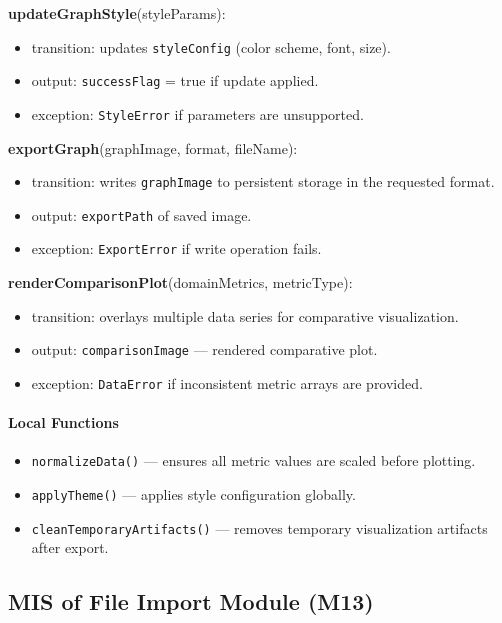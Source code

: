 \documentclass[12pt, titlepage]{article}
\begin{document}
\noindent \textbf{updateGraphStyle}(styleParams):
\begin{itemize}
  \item transition: updates \texttt{styleConfig} (color scheme, font, size).
  \item output: \texttt{successFlag} = true if update applied.
  \item exception: \texttt{StyleError} if parameters are unsupported.
\end{itemize}

\noindent \textbf{exportGraph}(graphImage, format, fileName):
\begin{itemize}
  \item transition: writes \texttt{graphImage} to persistent storage in the requested format.
  \item output: \texttt{exportPath} of saved image.
  \item exception: \texttt{ExportError} if write operation fails.
\end{itemize}

\noindent \textbf{renderComparisonPlot}(domainMetrics, metricType):
\begin{itemize}
  \item transition: overlays multiple data series for comparative visualization.
  \item output: \texttt{comparisonImage} — rendered comparative plot.
  \item exception: \texttt{DataError} if inconsistent metric arrays are provided.
\end{itemize}

\paragraph{Local Functions}
\begin{itemize}
  \item \texttt{normalizeData()} — ensures all metric values are scaled before plotting.
  \item \texttt{applyTheme()} — applies style configuration globally.
  \item \texttt{cleanTemporaryArtifacts()} — removes temporary visualization artifacts after export.
\end{itemize}


\subsection{MIS of File Import Module (M13)}
\label{mis:FileImportModule}
\end{document}
